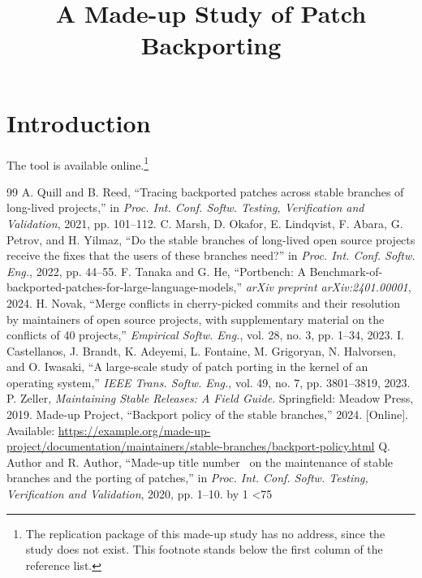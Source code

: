 \documentclass[conference]{IEEEtran}
\begin{document}
\title{A Made-up Study of Patch Backporting}
\author{}
\maketitle
\begin{abstract}
\lipsum[1][1-4]
\end{abstract}
\section{Introduction}
\lipsum[2-4]
The tool is available online.\footnote{The replication package of this made-up study has no address, since the
study does not exist. This footnote stands below the first column of the reference list.}
\lipsum[5][1-3]

\begin{thebibliography}{99}
 A. Quill and B. Reed, ``Tracing backported patches across stable branches of long-lived projects,'' in
\emph{Proc. Int. Conf. Softw. Testing, Verification and Validation}, 2021, pp. 101--112.
 C. Marsh, D. Okafor, E. Lindqvist, F. Abara, G. Petrov, and H. Yilmaz, ``Do the stable branches of\pagebreak{}
long-lived open source projects receive the fixes that the users of these branches need?'' in
\emph{Proc. Int. Conf. Softw. Eng.}, 2022, pp. 44--55.
 F. Tanaka and G. He, ``Portbench: A
\mbox{Benchmark-of-backported-patches-for-large-language-models,''} \emph{arXiv preprint arXiv:2401.00001}, 2024.
 H. Novak, ``Merge conflicts in cherry-picked commits and their resolution by maintainers of open source
projects, with\linebreak
supplementary material on the conflicts of 40 projects,'' \emph{Empirical Softw. Eng.}, vol. 28, no. 3, pp. 1--34, 2023.
 I. Castellanos, J. Brandt, K. Adeyemi, L. Fontaine, M. Grigoryan, N. Halvorsen, and O. Iwasaki,
``A large-scale study of patch porting in the kernel of an operating system,'' \emph{IEEE Trans. Softw. Eng.},
vol. 49, no. 7, pp. 3801--3819, 2023.
 P. Zeller, \emph{Maintaining Stable Releases: A Field Guide}. Springfield: Meadow Press, 2019.
 Made-up Project, ``Backport policy of the stable branches,'' 2024. [Online]. Available:
\url{https://example.org/made-up-project/documentation/maintainers/stable-branches/backport-policy.html}
\newcount\n {}
\loop {} Q. Author and R. Author, ``Made-up title number \the\n\ on the maintenance\ifnum{} \pagebreak\fi{} of stable
branches and the porting of patches,'' in \emph{Proc. Int. Conf. Softw. Testing, Verification and Validation}, 2020, pp. 1--10.
\advance\n by 1 \ifnum\n<75 \repeat
\end{thebibliography}
\end{document}
